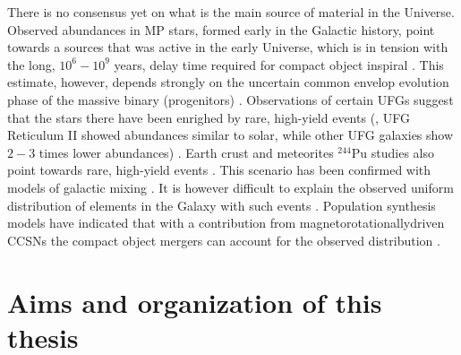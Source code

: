There is no consensus yet on what is the main source of \rproc{} material in the 
Universe. 
Observed \rproc{} abundances in \ac{MP} stars, formed early in the Galactic history, 
point towards a sources that was active in the early Universe, which is in tension with the long, 
$10^{6} - 10^{9}$ years, delay time required for compact object inspiral 
\citep{DeDonder:2004cx,Dominik:2012kk}. This estimate, however, depends strongly on the 
uncertain common envelop evolution phase of the massive binary (progenitors)
\citep[\eg][]{Dominik:2012kk}.
%
Observations of certain \acp{UFG} suggest that the stars there have been enrighed by rare, 
high-yield events (\eg, \ac{UFG} Reticulum II showed abundances similar to solar, 
while other \ac{UFG} galaxies show $2-3$ times lower abundances) \citep{Ji:2016}.
%
Earth crust and meteorites $^{244}$Pu studies also point towards rare, high-yield 
events \citep{Wallner:2015,Tsujimoto:2017}. This scenario has been confirmed with 
models of galactic mixing \citep{Hotokezaka:2015zea}.
%
It is however difficult to explain the observed uniform distribution of \rproc{} 
elements in the Galaxy with such events \citep{Argast:2003he}.
%
Population synthesis models have indicated that with a contribution from 
magnetorotationallydriven \acp{CCSN} the compact object mergers can account for the 
observed distribution \citep{Ishimaru:2015,Cescutti:2015,Wehmeyer:2015,VanDeVoort:2015}.












\section{Aims and organization of this thesis}

